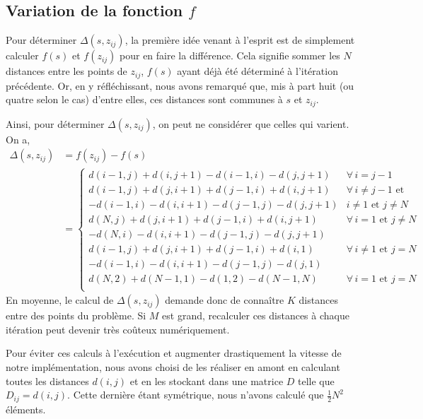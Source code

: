 \documentclass[a4paper, 12pt]{report}
\begin{document}
	\subsection{Variation de la fonction $f$}
	Pour déterminer $\Delta(s, z_{ij})$, la première idée venant à l'esprit est de simplement calculer $f(s)$ et $f(z_{ij})$ pour en faire la différence. Cela signifie sommer les $N$ distances entre les points de $z_{ij}$, $f(s)$ ayant déjà été déterminé à l'itération précédente. Or, en y réfléchissant, nous avons remarqué que, mis à part huit (ou quatre selon le cas) d'entre elles, ces distances sont communes à $s$ et $z_{ij}$. \par
	Ainsi, pour déterminer $\Delta(s, z_{ij})$, on peut ne considérer que celles qui varient. On a,
    \begin{align*}
        \Delta(s, z_{ij}) & = f(z_{ij}) - f(s) \\
        & =
        \begin{cases}
            d(i-1,j) + d(i,j+1) - d(i-1,i) - d(j,j+1) & \forall \, i = j - 1 \\[0.5em]
            d(i-1,j) + d(j,i+1) + d(j-1,i) + d(i,j+1) & \forall \, i \neq j - 1 \text{ et} \\
            - d(i-1,i) - d(i,i+1) - d(j-1,j) - d(j,j+1) & i \neq 1 \text{ et } j \neq N \\[0.5em]
            d(N,j) + d(j,i+1) + d(j-1,i) + d(i,j+1) & \forall \, i = 1 \text{ et } j \neq N \\
            - d(N,i) - d(i,i+1) - d(j-1,j) - d(j,j+1) & \\[0.5em]
            d(i-1,j) + d(j,i+1) + d(j-1,i) + d(i,1) & \forall \, i \neq 1 \text{ et } j = N \\
            - d(i-1,i) - d(i,i+1) - d(j-1,j) - d(j,1) & \\[0.5em]
            d(N,2) + d(N-1,1) - d(1,2) - d(N-1,N) & \forall \, i = 1 \text{ et } j = N \\
        \end{cases}
    \end{align*}
	En moyenne, le calcul de $\Delta(s, z_{ij})$ demande donc de connaître $K$ distances\footnotemark{} entre des points du problème. Si $M$ est grand, recalculer ces distances à chaque itération peut devenir très coûteux numériquement. \par
    Pour éviter ces calculs à l'exécution et augmenter drastiquement la vitesse de notre implémentation, nous avons choisi de les réaliser en amont en calculant toutes les distances $d(i,j)$ et en les stockant dans une matrice $D$ telle que $D_{ij} = d(i,j)$. Cette dernière étant symétrique, nous n'avons calculé que $\frac{1}{2} N^2$ éléments. \par
\end{document}
